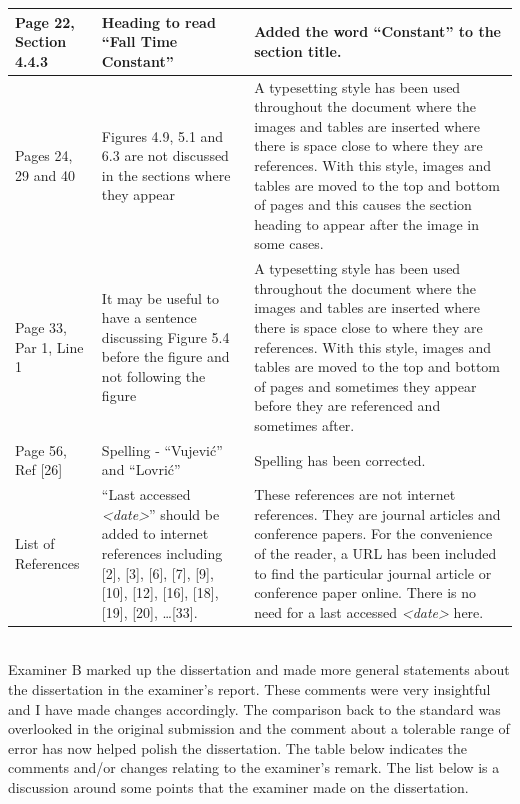 \documentclass[11pt,a4paper]{letter} %
\begin{document}
\begin{tabularx}{6.5in}{X|p{}|p{}}
	Page 22, Section 4.4.3 & Heading to read ``Fall Time Constant'' & Added the word ``Constant'' to the section title. \\ \hline
	Pages 24, 29 and 40 & Figures 4.9, 5.1 and 6.3 are not discussed in the sections where they appear & A typesetting style has been used throughout the document where the images and tables are inserted where there is space close to where they are references. With this style, images and tables are moved to the top and bottom of pages and this causes the section heading to appear after the image in some cases.  \\ \hline
	Page 33, Par 1, Line 1 & It may be useful to have a sentence discussing Figure 5.4 before the figure and not following the figure & A typesetting style has been used throughout the document where the images and tables are inserted where there is space close to where they are references. With this style, images and tables are moved to the top and bottom of pages and sometimes they appear before they are referenced and sometimes after. \\ \hline
	Page 56, Ref [26] & Spelling  - ``Vujevi\'c'' and ``Lovri\'c'' & Spelling has been corrected. \\ \hline
	List of References & ``Last accessed \textit{<date>}'' should be added to internet references including [2], [3], [6], [7], [9], [10], [12], [16], [18], [19], [20], \ldots [33]. & These references are not internet references. They are journal articles and conference papers. For the convenience of the reader, a URL has been included to find the particular journal article or conference paper online. There is no need for a last accessed \textit{<date>} here. \\ \hline
\end{tabularx}

\newpage
{}\\

Examiner B marked up the dissertation and made more general statements about the dissertation in the examiner's report. These comments were very insightful and I have made changes accordingly. The comparison back to the standard was overlooked in the original submission and the comment about a tolerable range of error has now helped polish the dissertation. The table below indicates the comments and/or changes relating to the examiner's remark. The list below is a discussion around some points that the examiner made on the dissertation.
\end{document}

